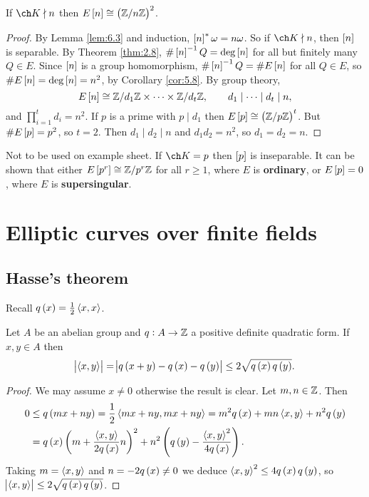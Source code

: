 \begin{theorem}
\label{thm:6.5}
If $ \ch K \nmid n $ then $ E\sbr{n} \cong \br{\ZZ / n\ZZ}^2 $.
\end{theorem}

\begin{proof}
By Lemma \ref{lem:6.3} and induction, $ \sbr{n}^*\omega = n\omega $. So if $ \ch K \nmid n $, then $ \sbr{n} $ is separable. By Theorem \ref{thm:2.8}, $ \#\sbr{n}^{-1}Q = \deg \sbr{n} $ for all but finitely many $ Q \in E $. Since $ \sbr{n} $ is a group homomorphism, $ \#\sbr{n}^{-1}Q = \#E\sbr{n} $ for all $ Q \in E $, so $ \#E\sbr{n} = \deg \sbr{n} = n^2 $, by Corollary \ref{cor:5.8}. By group theory,
$$ E\sbr{n} \cong \ZZ / d_1\ZZ \times \dots \times \ZZ / d_t\ZZ, \qquad d_1 \mid \dots \mid d_t \mid n, $$
and $ \prod_{i = 1}^t d_i = n^2 $. If $ p $ is a prime with $ p \mid d_1 $ then $ E\sbr{p} \cong \br{\ZZ / p\ZZ}^t $. But $ \#E\sbr{p} = p^2 $, so $ t = 2 $. Then $ d_1 \mid d_2 \mid n $ and $ d_1d_2 = n^2 $, so $ d_1 = d_2 = n $.
\end{proof}

\begin{remark*}
Not to be used on example sheet. If $ \ch K = p $ then $ \sbr{p} $ is inseparable. It can be shown that either $ E\sbr{p^r} \cong \ZZ / p^r\ZZ $ for all $ r \ge 1 $, where $ E $ is \textbf{ordinary}, or $ E\sbr{p} = 0 $, where $ E $ is \textbf{supersingular}.
\end{remark*}

\pagebreak

\section{Elliptic curves over finite fields}

\subsection{Hasse's theorem}

Recall $ q\br{x} = \tfrac{1}{2}\abr{x, x} $.

\begin{lemma}
\label{lem:7.1}
Let $ A $ be an abelian group and $ q : A \to \mathbb{Z} $ a positive definite quadratic form. If $ x, y \in A $ then
$$ \abs{\abr{x, y}} = \abs{q\br{x + y} - q\br{x} - q\br{y}} \le 2\sqrt{q\br{x}q\br{y}}. $$
\end{lemma}

\begin{proof}
We may assume $ x \ne 0 $ otherwise the result is clear. Let $ m, n \in \mathbb{Z} $. Then
\begin{align*}
0
& \le q\br{mx + ny}
= \dfrac{1}{2}\abr{mx + ny, mx + ny}
= m^2q\br{x} + mn\abr{x, y} + n^2q\br{y} \\
& = q\br{x}\br{m + \dfrac{\abr{x, y}}{2q\br{x}}n}^2 + n^2\br{q\br{y} - \dfrac{\abr{x, y}^2}{4q\br{x}}}.
\end{align*}
Taking $ m = \left\langle x, y \right\rangle $ and $ n = -2q\br{x} \ne 0 $ we deduce $ \abr{x, y}^2 \le 4q\br{x}q\br{y} $, so $ \abs{\abr{x, y}} \le 2\sqrt{q\br{x}q\br{y}} $.
\end{proof}

